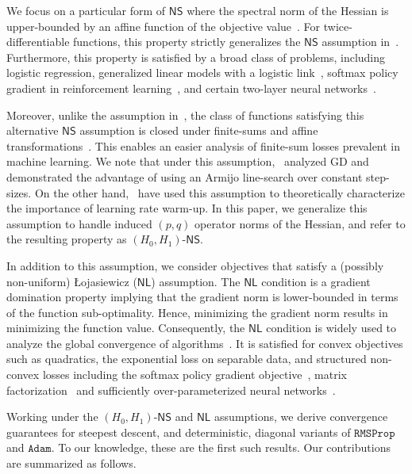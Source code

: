 \documentclass{article}
\newcommand{\RMS}{\texttt{RMSProp}}
\newcommand{\Adam}{\texttt{Adam}}
\newcommand{\NS}{\textsf{NS}}
\newcommand{\NL}{\textsf{NL}}
\begin{document}
We focus on a particular form of $\NS$ where the spectral norm of the Hessian is upper-bounded by an affine function of the objective value~\citep{vaswani2025armijo,alimisis2025we}. For twice-differentiable functions, this property strictly generalizes the $\NS$ assumption in~\citet{zhang2019gradient}. Furthermore, this property is satisfied by a broad class of problems, including logistic regression, generalized linear models with a logistic link~\citep{mei2021leveraging}, softmax policy gradient in reinforcement learning~\citep{mei2020global}, and certain two-layer neural networks~\citep{taheri2023fast,alimisis2025we}. 

Moreover, unlike the assumption in~\citet{zhang2019gradient}, the class of functions satisfying this alternative $\NS$ assumption is closed under finite-sums and affine transformations~\citep{alimisis2025we}. This enables an easier analysis of finite-sum losses prevalent in machine learning. We note that under this assumption,~\citet{vaswani2025armijo} analyzed GD and demonstrated the advantage of using an Armijo line-search over constant step-sizes. On the other hand,~\citet{alimisis2025we} have used this assumption to theoretically characterize the importance of learning rate warm-up. In this paper, we generalize this assumption to handle induced $(p,q)$ operator norms of the Hessian, and refer to the resulting property as $(H_0, H_1)$-$\NS$. 

In addition to this assumption, we consider objectives that satisfy a (possibly non-uniform) \L ojasiewicz ($\NL$) assumption. The $\NL$ condition is a gradient domination property implying that the gradient norm is lower-bounded in terms of the function sub-optimality. Hence, minimizing the gradient norm results in minimizing the function value. Consequently, the $\NL$ condition is widely used to analyze the global convergence of algorithms~\citep{karimi2016linear}. It is satisfied for convex objectives such as quadratics, the exponential loss on separable data, and structured non-convex losses including the softmax policy gradient objective~\citep{mei2020global}, matrix factorization~\citep{ward2023convergence} and sufficiently over-parameterized neural networks~\citep{liu2022loss,soltanolkotabi2018theoretical,zou2019improved,li2018learning}. 

Working under the $(H_0, H_1)$-$\NS$ and $\NL$ assumptions, we derive convergence guarantees for steepest descent, and deterministic, diagonal variants of $\RMS$ and $\Adam$. To our knowledge, these are the first such results. Our contributions are summarized as follows.
\end{document}
